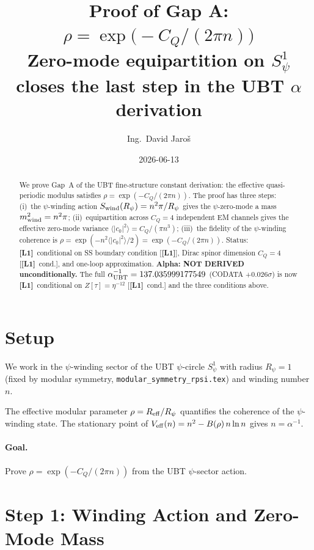 \documentclass[12pt,a4paper]{article}
\title{\textbf{Proof of Gap A: $\rho = \exp\!\bigl(-C_Q/(2\pi n)\bigr)$}\\[4pt]
\large Zero-mode equipartition on $S^1_\psi$ closes the last step
in the UBT $\alpha$ derivation}
\author{Ing.\ David Jaroš}
\date{2026-06-13}
\theoremstyle{definition}\newtheorem{definition}[theorem]{Definition}
\theoremstyle{remark}\newtheorem{remark}[theorem]{Remark}
\newcommand{\Lo}{\textbf{[L1]}}
\begin{document}
\maketitle
\fi

\begin{abstract}
We prove Gap~A of the UBT fine-structure constant derivation:
the effective quasi-periodic modulus satisfies
$\rho = \exp(-C_Q/(2\pi n))$.
The proof has three steps: (i)~the $\psi$-winding action
$S_{\rm wind}(R_\psi) = n^2\pi/R_\psi$ gives the $\psi$-zero-mode
a mass $m^2_{\rm wind} = n^2\pi$; (ii)~equipartition across $C_Q=4$
independent EM channels gives the effective zero-mode variance
$\langle|c_0|^2\rangle = C_Q/(\pi n^3)$; (iii)~the fidelity of
the $\psi$-winding coherence is $\rho = \exp(-n^2\langle|c_0|^2\rangle/2)
= \exp(-C_Q/(2\pi n))$.
Status: \Lo\ conditional on SS boundary condition [\Lo],
Dirac spinor dimension $C_Q=4$ [\Lo\ cond.], and one-loop
approximation.
\textbf{Alpha: NOT DERIVED unconditionally.}
The full $\alpha^{-1}_{\rm UBT} = 137.035999177549$
(CODATA $+0.026\sigma$) is now \Lo\ conditional
on $Z[\tau]=\eta^{-12}$ [\Lo\ cond.] and the three conditions above.
\end{abstract}

\section{Setup}
\label{sec:setup}

We work in the $\psi$-winding sector of the UBT $\psi$-circle
$S^1_\psi$ with radius $R_\psi = 1$ (fixed by modular symmetry,
\texttt{modular\_symmetry\_rpsi.tex}) and winding number $n$.

The effective modular parameter $\rho = R_{\rm eff}/R_\psi$
quantifies the coherence of the $\psi$-winding state.  The
stationary point of $V_{\rm eff}(n) = n^2 - B(\rho)\,n\ln n$
gives $n = \alpha^{-1}$.

\paragraph{Goal.}  Prove $\rho = \exp(-C_Q/(2\pi n))$ from the
UBT $\psi$-sector action.

\section{Step 1: Winding Action and Zero-Mode Mass}
\label{sec:step1}
\end{document}
